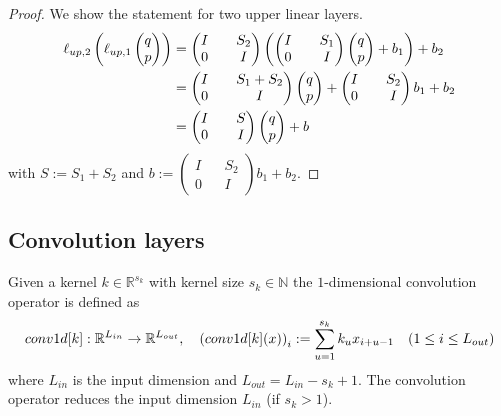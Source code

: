 \documentclass[twoside,a4paper]{article}
\begin{document}
\begin{proof}
	We show the statement for two upper linear layers.
	\begin{align*}
		\ell_{up,2}\left(\ell_{up,1} \begin{pmatrix} q \\ p \end{pmatrix}\right) &=
		\begin{pmatrix}
			I && S_2 \\
			0 && I
		\end{pmatrix}
		\left(
		\begin{pmatrix}
			I && S_1 \\
			0 && I
		\end{pmatrix}
		\begin{pmatrix} q \\ p \end{pmatrix} + b_1
		\right) + b_2 \\
		&= \begin{pmatrix}
			I && S_1 + S_2 \\
			0 && I
		\end{pmatrix} \begin{pmatrix} q \\ p \end{pmatrix}
		+ \begin{pmatrix}
			I && S_2 \\
			0 && I
		\end{pmatrix} b_1
		+ b_2 \\
		&= \begin{pmatrix}
			I && S \\
			0 && I
		\end{pmatrix} \begin{pmatrix} q \\ p \end{pmatrix} + b
	\end{align*}
	with $S := S_1 + S_2$ and $b := \begin{pmatrix}
		I && S_2 \\
		0 && I
	\end{pmatrix} b_1
	+ b_2$.
\end{proof}

\subsection{Convolution layers}


Given a kernel $k \in \mathbb{R}^{s_k}$ with kernel size $s_k \in \mathbb{N}$
the $1$-dimensional convolution operator is defined as
\begin{equation*}
	conv1d[k]: \mathbb{R}^{L_{in}} \to \mathbb{R}^{L_{out}}, \quad
	\left( conv1d[k](x) \right)_i := \sum_{u=1}^{s_k} k_u x_{i+u-1} \quad
	(1 \leq i \leq L_{out})
\end{equation*}
where $L_{in}$ is the input dimension and $L_{out} = L_{in} - s_k + 1$.
The convolution operator reduces the input dimension $L_{in}$ (if $s_k > 1$).

\end{document}
